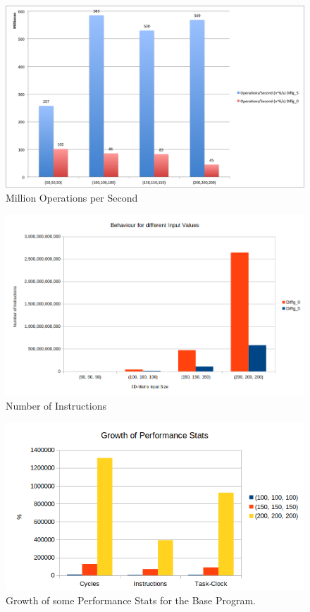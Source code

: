 \documentclass[12pt,a4paper]{article}
\begin{document}
\begin{figure}[h]
	\centering
	\includegraphics[width=1.0\linewidth]{"Benchmark 2/oper"}
	\caption{Million Operations per Second}
	\label{fig:oper}
\end{figure}
\begin{figure}[h]
	\centering
	\includegraphics[width=1.0\linewidth]{"Benchmark 2/instructionsinput"}
	\caption{Number of Instructions}
	\label{fig:instructionsinput}
\end{figure}
\begin{figure}[h]
	\centering
	\includegraphics[width=1.0\linewidth]{"Benchmark 2/growth"}
	\caption{Growth of some Performance Stats for the Base Program. }
	\label{fig:growth}
\end{figure}
\end{document}

